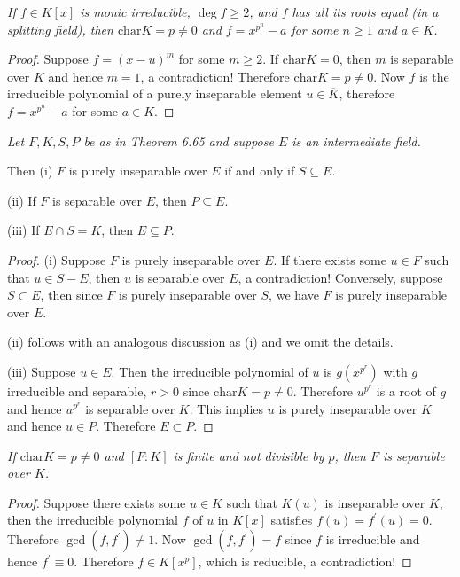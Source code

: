 \begin{problem}\em
If $f\in K[x]$ is monic irreducible, $\deg{f}\geq 2$, and $f$ has all its roots equal (in a splitting field), then $\mathrm{char}K=p\neq 0$ and $f=x^{p^n}-a$ for some $n\geq 1$ and $a\in K$.
\end{problem}
\begin{proof}
Suppose $f=(x-u)^m$ for some $m\ge 2$. If $\mathrm{char}K=0$, then $m$ is separable over $K$ and hence $m=1$, a contradiction! Therefore $\mathrm{char}K=p\ne 0$. Now $f$ is the irreducible polynomial of a purely inseparable element $u\in\overline{K}$, therefore $f=x^{p^n}-a$ for some $a\in K$.
\end{proof}
\begin{problem}\em
Let $F, K, S, P$ be as in Theorem 6.65 and suppose $E$ is an intermediate field.\par
Then
(i) $F$ is purely inseparable over $E$ if and only if $S\subseteq E$.\par
(ii) If $F$ is separable over $E$, then $P\subseteq E$.\par
(iii) If $E\cap S=K$, then $E\subseteq P$.
\end{problem}
\begin{proof}
(i) Suppose $F$ is purely inseparable over $E$. If there exists some $u\in F$ such that $u\in S-E$, then $u$ is separable over $E$, a contradiction! Conversely, suppose $S\subset E$, then since $F$ is purely inseparable over $S$, we have $F$ is purely inseparable over $E$.\par
(ii) follows with an analogous discussion as (i) and we omit the details.\par
(iii) Suppose $u\in E$. Then the irreducible polynomial of $u$ is $g(x^{p^r})$ with $g$ irreducible and separable, $r>0$ since $\mathrm{char}K=p\ne 0$. Therefore $u^{p^r}$ is a root of $g$ and hence $u^{p^r}$ is separable over $K$. This implies $u$ is purely inseparable over $K$ and hence $u\in P$. Therefore $E\subset P$.
\end{proof}
\begin{problem}\em
If $\mathrm{char}K=p\neq 0$ and $[F:K]$ is finite and not divisible by $p$, then $F$ is separable over $K$.
\end{problem}
\begin{proof}
Suppose there exists some $u\in K$ such that $K(u)$ is inseparable over $K$, then the irreducible polynomial $f$ of $u$ in $K[x]$ satisfies $f(u)=f^\prime(u)=0$. Therefore $\gcd(f,f^\prime)\ne 1$. Now $\gcd(f,f^\prime)=f$ since $f$ is irreducible and hence $f^\prime\equiv 0$. Therefore $f\in K[x^p]$, which is reducible, a contradiction!
\end{proof}

